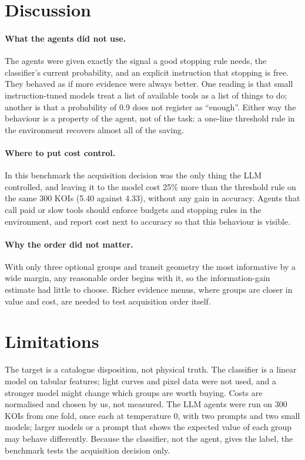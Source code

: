 \documentclass[11pt,a4paper]{article}
\begin{document}
\section{Discussion}

\paragraph{What the agents did not use.} The agents were given exactly the signal a good stopping rule needs, the
classifier's current probability, and an explicit instruction that stopping is free. They behaved as if more evidence
were always better. One reading is that small instruction-tuned models treat a list of available tools as a list of
things to do; another is that a probability of 0.9 does not register as ``enough''. Either way the behaviour is a
property of the agent, not of the task: a one-line threshold rule in the environment recovers almost all of the saving.

\paragraph{Where to put cost control.} In this benchmark the acquisition decision was the only thing the LLM
controlled, and leaving it to the model cost 25\% more than the threshold rule on the same 300 KOIs (5.40 against
4.33), without any gain in accuracy. Agents that call paid or slow tools should enforce
budgets and stopping rules in the environment, and report cost next to accuracy so that this behaviour is visible.

\paragraph{Why the order did not matter.} With only three optional groups and transit geometry the most informative
by a wide margin, any reasonable order begins with it, so the information-gain estimate had little to choose. Richer
evidence menus, where groups are closer in value and cost, are needed to test acquisition order itself.

\section{Limitations}

The target is a catalogue disposition, not physical truth. The classifier is a linear model on tabular features;
light curves and pixel data were not used, and a stronger model might change which groups are worth buying. Costs
are normalised and chosen by us, not measured. The LLM agents were run on 300 KOIs from one fold, once each at
temperature 0, with two prompts and two small models; larger models or a prompt that shows the expected value of each
group may behave differently. Because the classifier, not the agent, gives the label, the benchmark tests the
acquisition decision only.
\end{document}
